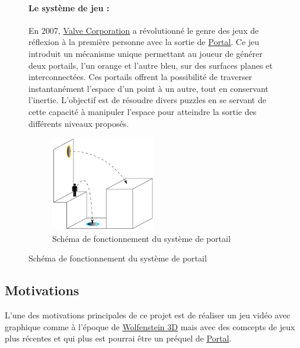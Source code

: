 \documentclass[12pt]{report}
\begin{document}






\begin{figure}[H]
	\paragraph{Le système de jeu : }
	En 2007, \href{https://fr.wikipedia.org/wiki/Valve_Corporation}{Valve Corporation} a révolutionné le genre des jeux 
	de réflexion à la première personne avec la sortie de 
	\href{https://fr.wikipedia.org/wiki/Portal_(jeu_vid%C3%A9o)}{Portal}. Ce jeu introduit un mécanisme unique 
	permettant au joueur de générer deux portails, l'un orange et l'autre bleu, sur des surfaces planes et 
	interconnectées. Ces portails offrent la possibilité de traverser instantanément l'espace d'un point à un autre, 
	tout en conservant l'inertie. L'objectif est de résoudre divers puzzles en se servant de cette capacité à manipuler 
	l'espace pour atteindre la sortie des différents niveaux proposés.
	\begin{figure}[H]
		\centering
		\includegraphics[width=0.5\textwidth]{image/schema_portal.png}
		\hspace*{-0.5cm}
		\caption{Schéma de fonctionnement du système de portail}
		\label{fig:schema_portal}
	\end{figure}
\end{figure}

\subsection{Motivations}


L'une des motivations principales de ce projet est de réaliser un jeu vidéo
avec graphique comme à l'époque de \href{https://fr.wikipedia.org/wiki/Wolfenstein_3D}{Wolfenstein 3D} 
mais avec des comcepts de jeux plus récentes et qui plus est pourrai être
un préquel de \href{https://fr.wikipedia.org/wiki/Portal_(jeu_vid%C3%A9o)}{Portal}.
\end{document}
